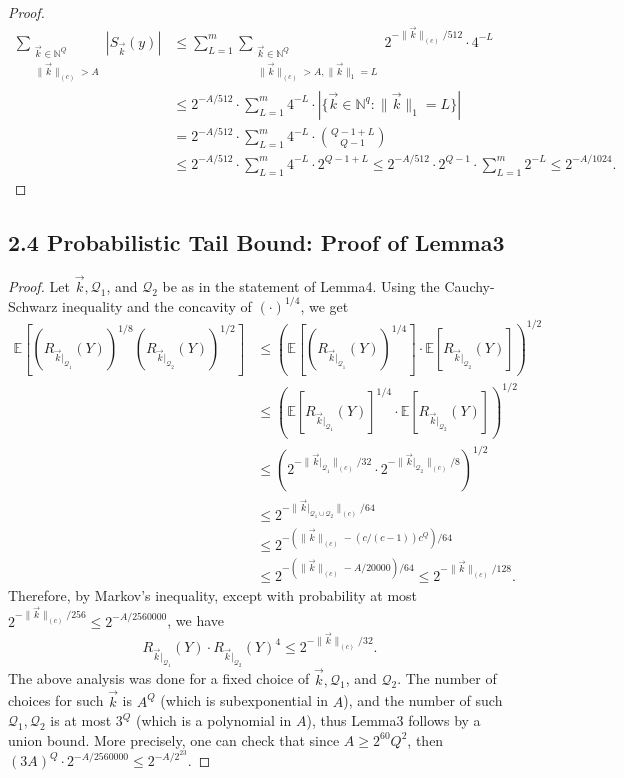 \documentclass[10pt,a4paper]{article}
\begin{document}
\begin{proof}
\begin{align*}
\sum_{\substack{\vec k\in\mathbb N^Q\\\|\vec k\|_{(c)}>A}}|S_{\vec k}(y)|
&\le\sum_{L=1}^m\sum_{\substack{\vec k\in\mathbb N^Q\\\|\vec k\|_{(c)}>A,\|\vec k\|_1=L}}2^{-\|\vec k\|_{(c)}/512}\cdot4^{-L}\\
&\le2^{-A/512}\cdot\sum_{L=1}^m4^{-L}\cdot|\{\vec k\in\mathbb N^q:\|\vec k\|_1=L\}|\\
&=2^{-A/512}\cdot\sum_{L=1}^m4^{-L}\cdot\binom{Q-1+L}{Q-1}\\
&\le2^{-A/512}\cdot\sum_{L=1}^m4^{-L}\cdot2^{Q-1+L}
\le2^{-A/512}\cdot2^{Q-1}\cdot\sum_{L=1}^m2^{-L}\le2^{-A/1024}.
\end{align*}
\end{proof}
\subsection*{2.4 Probabilistic Tail Bound: Proof of Lemma3}
\begin{proof}
Let $\vec k,\mathcal Q_1$, and $\mathcal Q_2$ be as in the statement of Lemma4. Using the Cauchy-Schwarz inequality and the concavity of $(\cdot)^{1/4}$, we get
\begin{align*}
\mathbb E[(R_{\vec k|_{\mathcal Q_1}}(Y))^{1/8}(R_{\vec k|_{\mathcal Q_2}}(Y))^{1/2}]
&\le\left(\mathbb E[(R_{\vec k|_{\mathcal Q_1}}(Y))^{1/4}]\cdot\mathbb E[R_{\vec k|_{\mathcal Q_2}}(Y)]\right)^{1/2}\\
&\le\left(\mathbb E[R_{\vec k|_{\mathcal Q_1}}(Y)]^{1/4}\cdot\mathbb E[R_{\vec k|_{\mathcal Q_2}}(Y)]\right)^{1/2}\\
&\le(2^{-\|\vec k|_{\mathcal Q_1}\|_{(c)}/32}\cdot2^{-\|\vec k|_{\mathcal Q_2}\|_{(c)}/8})^{1/2}\\
&\le2^{-\|\vec k|_{\mathcal Q_1\cup\mathcal Q_2}\|_{(c)}/64}\\
&\le2^{-(\|\vec k\|_{(c)}-(c/(c-1))c^Q)/64}\\
&\le2^{-(\|\vec k\|_{(c)}-A/20000)/64}\le2^{-\|\vec k\|_{(c)}/128}.
\end{align*}
Therefore, by Markov's inequality, except with probability at most $2^{-\|\vec k\|_{(c)}/256}\le2^{-A/2560000}$, we have
\[
R_{\vec k|_{\mathcal Q_1}}(Y)\cdot R_{\vec k|_{\mathcal Q_2}}(Y)^4\le2^{-\|\vec k\|_{(c)}/32}.
\]
The above analysis was done for a fixed choice of $\vec k,\mathcal Q_1$, and $\mathcal Q_2$. The number of choices for such $\vec k$ is $A^Q$ (which is subexponential in $A$), and the number of such $\mathcal Q_1,\mathcal Q_2$ is at most $3^Q$ (which is a polynomial in $A$), thus Lemma3 follows by a union bound. More precisely, one can check that since $A\ge2^{60}Q^2$, then $(3A)^Q\cdot2^{-A/2560000}\le2^{-A/2^{23}}$.
\end{proof}
\end{document}
